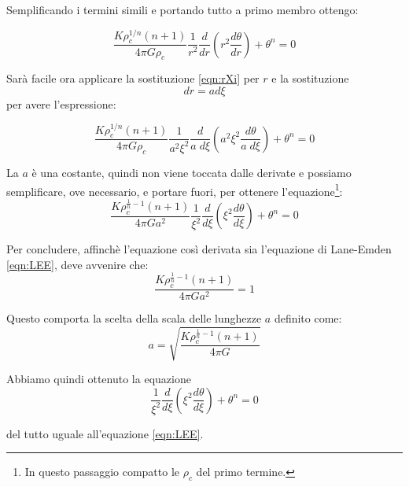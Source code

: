 \documentclass{article}
\begin{document}
Semplificando i termini simili e portando tutto a primo membro ottengo:

\begin{equation*}
 \frac{K\rho_c^{1/n}\left ( n+1 \right )}{4\pi G \rho_c} \frac{1}{r^2} \frac{d}{dr}\left (r^2\frac{d\theta}{dr} \right )+ \theta^n = 0
\end{equation*}

Sarà facile ora applicare la sostituzione \ref{eqn:rXi} per $r$ e la sostituzione 
\begin{equation}\label{eqn:drXi}
 dr = ad\xi
\end{equation}
per avere l'espressione:

\begin{equation*}
 \frac{K\rho_c^{1/n}\left ( n+1 \right )}{4\pi G \rho_c} \frac{1}{a^2\xi^2} \frac{d}{a\; d\xi}\left (a^2\xi^2\frac{d\theta}{a\; d\xi} \right )+ \theta^n = 0
\end{equation*}

La $a$ è una costante, quindi non viene toccata dalle derivate e possiamo semplificare, ove necessario, e portare fuori, per ottenere l'equazione\footnote{In questo passaggio compatto le $\rho_c$ del primo termine.}:
\begin{equation*}
 \frac{K\rho_c^{\frac{1}{n} -1}\left ( n+1 \right )}{4\pi G a^2} \frac{1}{\xi^2} \frac{d}{d\xi}\left (\xi^2\frac{d\theta}{d\xi} \right )+ \theta^n = 0
\end{equation*}

Per concludere, affinchè l'equazione così derivata sia l'equazione di Lane-Emden \ref{eqn:LEE}, deve avvenire che:
\begin{equation*}
 \frac{K\rho_c^{\frac{1}{n}-1}\left ( n+1 \right )}{4\pi G a^2} = 1
\end{equation*}

Questo comporta la scelta della scala delle lunghezze $a$ definito come:
\begin{equation}\label{eqn:aSL}
 a = \sqrt{\frac{K\rho_c^{\frac{1}{n}-1} \left ( n+1 \right )}{4\pi G}} 
\end{equation}

Abbiamo quindi ottenuto la equazione 
\begin{equation*}
 \frac{1}{\xi^2}\frac{d}{d\xi} \left ( \xi^2 \frac{d\theta}{d\xi} \right ) + \theta^n = 0
\end{equation*}

del tutto uguale all'equazione \ref{eqn:LEE}.
\end{document}
